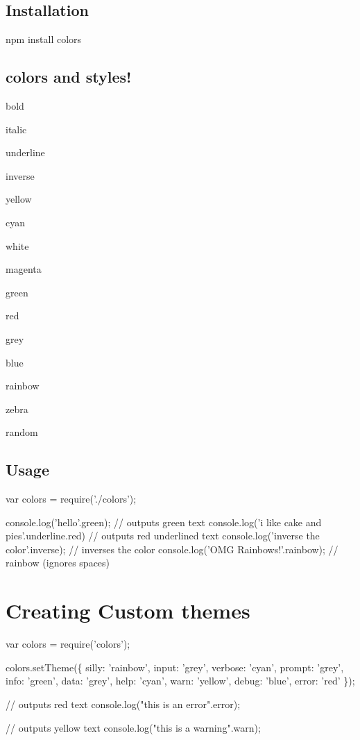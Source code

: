 

\subsection*{Installation}

\begin{DoxyVerb}npm install colors
\end{DoxyVerb}


\subsection*{colors and styles!}


\begin{DoxyItemize}
\item bold
\item italic
\item underline
\item inverse
\item yellow
\item cyan
\item white
\item magenta
\item green
\item red
\item grey
\item blue
\item rainbow
\item zebra
\item random
\end{DoxyItemize}

\subsection*{Usage}


\begin{DoxyCode}
var colors = require('./colors');

console.log('hello'.green); // outputs green text
console.log('i like cake and pies'.underline.red) // outputs red underlined text
console.log('inverse the color'.inverse); // inverses the color
console.log('OMG Rainbows!'.rainbow); // rainbow (ignores spaces)
\end{DoxyCode}


\section*{Creating Custom themes}


\begin{DoxyCode}
var colors = require('colors');

colors.setTheme(\{
  silly: 'rainbow',
  input: 'grey',
  verbose: 'cyan',
  prompt: 'grey',
  info: 'green',
  data: 'grey',
  help: 'cyan',
  warn: 'yellow',
  debug: 'blue',
  error: 'red'
\});

// outputs red text
console.log("this is an error".error);

// outputs yellow text
console.log("this is a warning".warn);
\end{DoxyCode}


